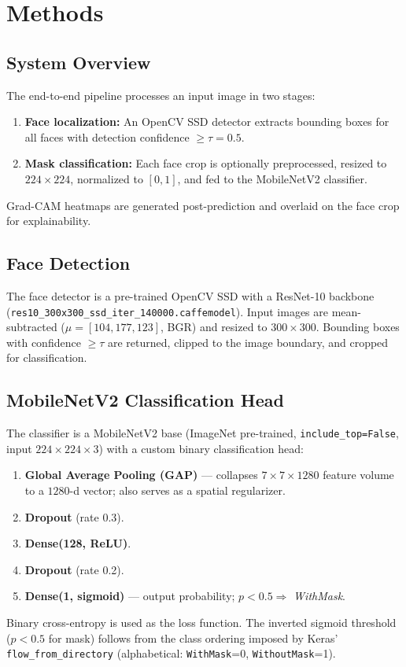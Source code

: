 \documentclass[11pt,a4paper]{article}
\begin{document}
\section{Methods}

\subsection{System Overview}

The end-to-end pipeline processes an input image in two stages:
\begin{enumerate}[nosep, leftmargin=1.5em]
    \item \textbf{Face localization:} An OpenCV SSD detector extracts bounding
          boxes for all faces with detection confidence $\geq \tau = 0.5$.
    \item \textbf{Mask classification:} Each face crop is optionally preprocessed,
          resized to $224{\times}224$, normalized to $[0,1]$, and fed to the
          MobileNetV2 classifier.
\end{enumerate}
Grad-CAM heatmaps are generated post-prediction and overlaid on the face crop for
explainability.

\subsection{Face Detection}

The face detector is a pre-trained OpenCV SSD with a ResNet-10 backbone
(\texttt{res10\_300x300\_ssd\_iter\_140000.caffemodel}).
Input images are mean-subtracted ($\mu = [104, 177, 123]$, BGR) and resized to
$300{\times}300$.
Bounding boxes with confidence $\geq \tau$ are returned, clipped to the image
boundary, and cropped for classification.

\subsection{MobileNetV2 Classification Head}

The classifier is a MobileNetV2 base (ImageNet pre-trained, \texttt{include\_top=False},
input $224{\times}224{\times}3$) with a custom binary classification head:
\begin{enumerate}[nosep, leftmargin=1.5em]
    \item \textbf{Global Average Pooling (GAP)} — collapses $7{\times}7{\times}1280$
          feature volume to a $1280$-d vector; also serves as a spatial regularizer.
    \item \textbf{Dropout} (rate 0.3).
    \item \textbf{Dense(128, ReLU)}.
    \item \textbf{Dropout} (rate 0.2).
    \item \textbf{Dense(1, sigmoid)} — output probability;
          $p < 0.5 \Rightarrow$ \textit{WithMask}.
\end{enumerate}
Binary cross-entropy is used as the loss function.
The inverted sigmoid threshold ($p < 0.5$ for mask) follows from the class
ordering imposed by Keras' \texttt{flow\_from\_directory} (alphabetical:
\texttt{WithMask}=0, \texttt{WithoutMask}=1).
\end{document}

